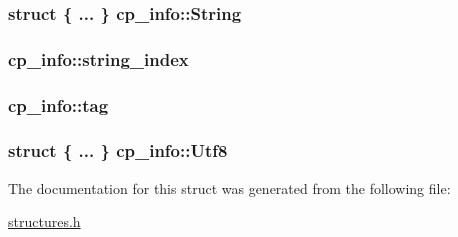 \subsubsection[{\texorpdfstring{String}{String}}]{\setlength{\rightskip}{0pt plus 5cm}struct \{ ... \}   cp\+\_\+info\+::\+String}\hypertarget{structcp__info_a453cf965166c542ff75a14db651769e3}{}\label{structcp__info_a453cf965166c542ff75a14db651769e3}
\subsubsection[{\texorpdfstring{string\+\_\+index}{string_index}}]{ cp\+\_\+info\+::string\+\_\+index}\hypertarget{structcp__info_ae760e12a2ee01b0ace3d35170ca07981}{}\label{structcp__info_ae760e12a2ee01b0ace3d35170ca07981}
\subsubsection[{\texorpdfstring{tag}{tag}}]{ cp\+\_\+info\+::tag}\hypertarget{structcp__info_a045b8801a6e96a2a31d3b62ea684f141}{}\label{structcp__info_a045b8801a6e96a2a31d3b62ea684f141}
\subsubsection[{\texorpdfstring{Utf8}{Utf8}}]{\setlength{\rightskip}{0pt plus 5cm}struct \{ ... \}   cp\+\_\+info\+::\+Utf8}\hypertarget{structcp__info_af0b0a05e0079e3d1b0c99cd3c0e4463a}{}\label{structcp__info_af0b0a05e0079e3d1b0c99cd3c0e4463a}


The documentation for this struct was generated from the following file\+:\begin{DoxyCompactItemize}
\item 
\hyperlink{structures_8h}{structures.\+h}\end{DoxyCompactItemize}
